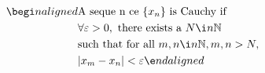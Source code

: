 \documentclass[preview]{standalone}
\begin{document}
\begin{align*}
\begi n {alig n ed}&\text{A seque n ce } \{ x_n \} \text{ is Cauchy if } \\ &\forall  \varepsilon  > 0, \text{ there exists a }  N  \i n   \mathbb{N}  \\ &\text{such that for all }  m ,  n  \i n   \mathbb{N} ,  m ,  n  >  N , \\ & |x_m - x_n|  <  \varepsilon \e n d{alig n ed}
\end{align*}
\end{document}
